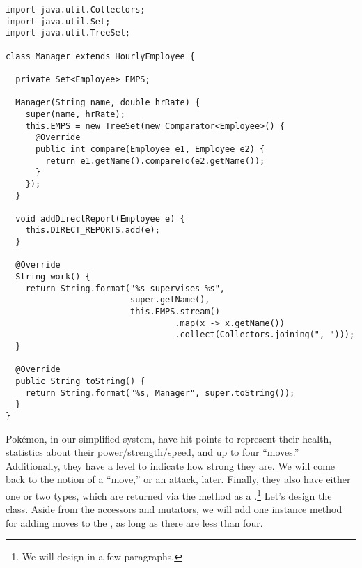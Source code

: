 \begin{lstlisting}[language=MyJava]
import java.util.Collectors;
import java.util.Set;
import java.util.TreeSet;

class Manager extends HourlyEmployee {

  private Set<Employee> EMPS;

  Manager(String name, double hrRate) {
    super(name, hrRate);
    this.EMPS = new TreeSet(new Comparator<Employee>() {
      @Override
      public int compare(Employee e1, Employee e2) {
        return e1.getName().compareTo(e2.getName());
      }
    });
  }

  void addDirectReport(Employee e) {
    this.DIRECT_REPORTS.add(e);
  }

  @Override
  String work() {
    return String.format("%s supervises %s", 
                         super.getName(),
                         this.EMPS.stream()
                                  .map(x -> x.getName())
                                  .collect(Collectors.joining(", ")));
  }

  @Override
  public String toString() {
    return String.format("%s, Manager", super.toString());
  }
}
\end{lstlisting}


Pok\'emon, in our simplified system, have hit-points to represent their health, statistics about their power/strength/speed, and up to four ``moves.'' Additionally, they have a level to indicate how strong they are. We will come back to the notion of a ``move,'' or an attack, later. Finally, they also have either one or two types, which are returned via the  method as a .\footnote{We will design  in a few paragraphs.} Let's design the  class. Aside from the accessors and mutators, we will add one instance method for adding moves to the , as long as there are less than four. 

